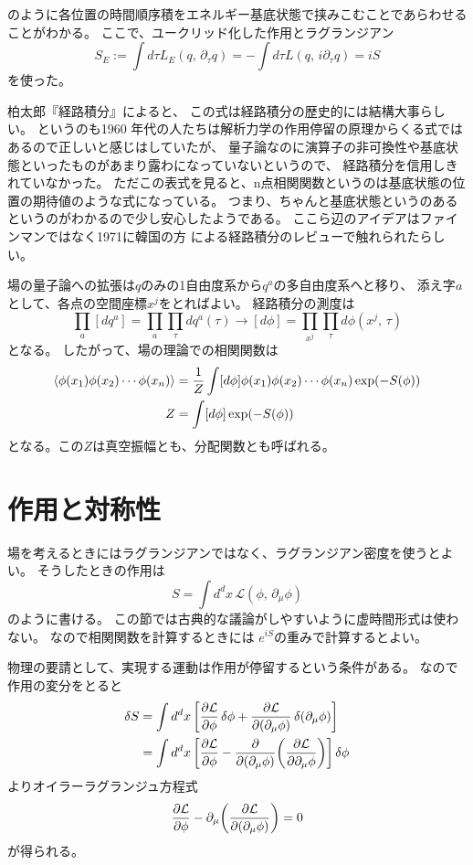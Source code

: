 \documentclass[../../master.tex]{subfiles}
\begin{document}
のように各位置の時間順序積をエネルギー基底状態で挟みこむことであらわせることがわかる。
ここで、ユークリッド化した作用とラグランジアン
\begin{equation}
    S_E := \int d\tau L_E(q,\,\partial_\tau q) = - \int d\tau L(q,\,i\partial_\tau q) = i S
\end{equation}
を使った。

柏太郎『経路積分』\cite{book:kashiwa-taro_2015}によると、
この式は経路積分の歴史的には結構大事らしい。
というのも1960 年代の人たちは解析力学の作用停留の原理からくる式ではあるので正しいと感じはしていたが、
量子論なのに演算子の非可換性や基底状態といったものがあまり露わになっていないというので、
経路積分を信用しきれていなかった。
ただこの表式を見ると、n点相関関数というのは基底状態の位置の期待値のような式になっている。
つまり、ちゃんと基底状態というのあるというのがわかるので少し安心したようである。
ここら辺のアイデアはファインマンではなく1971に韓国の方 %
による経路積分のレビューで触れられたらしい。 %

場の量子論への拡張は\(q\)のみの1自由度系から\(q^a\)の多自由度系へと移り、
添え字\(a\)として、各点の空間座標\(x^j\)をとればよい。
経路積分の測度は
\begin{equation}
    \prod_a [dq^a] = \prod_{a}\prod_{\tau} dq^a(\tau) \rightarrow [d\phi] = \prod_{x^j}\prod_{\tau}d\phi(x^j,\,\tau)
\end{equation}
となる。
したがって、場の理論での相関関数は
\begin{align}
    \ev{\phi(x_1)\phi(x_2)\cdots\phi(x_n)}
    &= \frac{1}{Z} \int[d\phi] \phi(x_1)\phi(x_2)\cdots\phi(x_n) \exp(-S(\phi))\\
    Z
    &= \int[d\phi] \exp(-S(\phi))
\end{align}
となる。この\(Z\)は真空振幅とも、分配関数とも呼ばれる。

\section{作用と対称性}
場を考えるときにはラグランジアンではなく、ラグランジアン密度を使うとよい。
そうしたときの作用は
\begin{equation*}
    S = \int d^dx\, \mathcal{L}(\phi,\,\partial_\mu \phi)
\end{equation*}
のように書ける。
この節では古典的な議論がしやすいように虚時間形式は使わない。
なので相関関数を計算するときには
\(e^{iS}\)の重みで計算するとよい。

物理の要請として、実現する運動は作用が停留するという条件がある。
なので作用の変分をとると
\begin{align}
    \var{S}
    &= \int d^d x\, \qty[\pdv{\mathcal{L}}{\phi}\var{\phi}+\pdv{\mathcal{L}}{(\partial_\mu \phi)}\var(\partial_\mu \phi)] \notag\\
    &= \int d^d x\, \qty[\pdv{\mathcal{L}}{\phi}-\pdv{(\partial_\mu \phi)}\qty(\pdv{\mathcal{L}}{\partial_\mu \phi})]\var{\phi}
\end{align}
よりオイラーラグランジュ方程式
\begin{equation}
    \pdv{\mathcal{L}}{\phi}-\partial_\mu\qty(\pdv{\mathcal{L}}{(\partial_\mu \phi)}) = 0
\end{equation}
が得られる。
\end{document}
